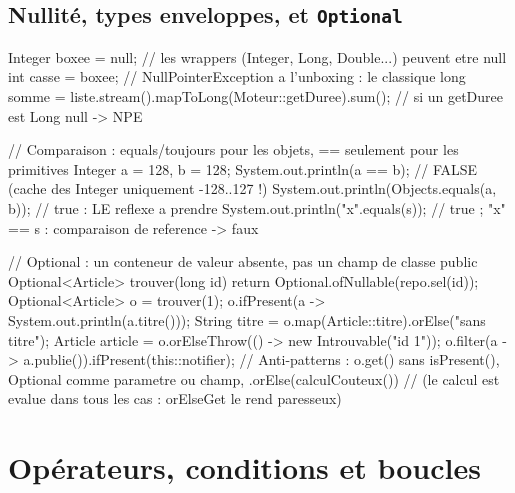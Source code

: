 \subsection{Nullit\'e, types enveloppes, et \texttt{Optional}}

\begin{codejava}
Integer boxee = null;                  // les wrappers (Integer, Long, Double...) peuvent etre null
int casse = boxee;                      // NullPointerException a l'unboxing : le classique
long somme = liste.stream().mapToLong(Moteur::getDuree).sum();  // si un getDuree est Long null -> NPE

// Comparaison : equals/toujours pour les objets, == seulement pour les primitives
Integer a = 128, b = 128;
System.out.println(a == b);             // FALSE  (cache des Integer uniquement -128..127 !)
System.out.println(Objects.equals(a, b));   // true : LE reflexe a prendre
System.out.println("x".equals(s));         // true ; "x" == s : comparaison de reference -> faux

// Optional : un conteneur de valeur absente, pas un champ de classe
public Optional<Article> trouver(long id) {
    return Optional.ofNullable(repo.sel(id));
}
Optional<Article> o = trouver(1);
o.ifPresent(a -> System.out.println(a.titre()));
String titre = o.map(Article::titre).orElse("sans titre");
Article article = o.orElseThrow(() -> new Introuvable("id 1"));
o.filter(a -> a.publie()).ifPresent(this::notifier);
// Anti-patterns : o.get() sans isPresent(), Optional comme parametre ou champ, .orElse(calculCouteux())
// (le calcul est evalue dans tous les cas : orElseGet le rend paresseux)
\end{codejava}

\section{Op\'erateurs, conditions et boucles}

